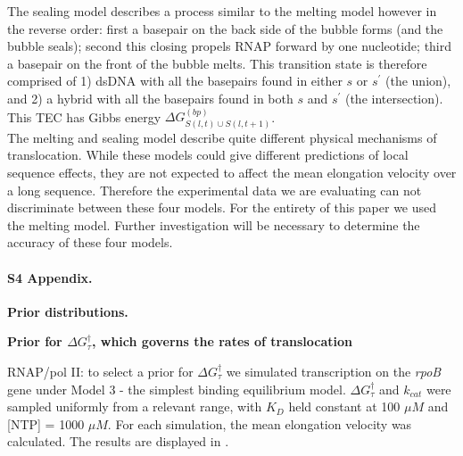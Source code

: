 \documentclass[10pt,letterpaper]{article}
\begin{document}
The sealing model describes a process similar to the melting model however in the reverse order: first a basepair on the back side of the bubble forms (and the bubble seals); second this closing propels RNAP forward by one nucleotide; third a basepair on the front of the bubble melts. This transition state is therefore comprised of 1) dsDNA with all the basepairs found in either $s$ or $s^\prime$ (the union), and 2) a hybrid with all the basepairs found in both $s$ and $s^\prime$ (the intersection). This TEC has Gibbs energy $\Delta G_{S(l,t)\cup S(l,t+1)}^{(bp)}$.  \\


The melting and sealing model describe quite different physical mechanisms of translocation. While these models could give different predictions of local sequence effects, they are not expected to affect the mean elongation velocity over a long sequence. Therefore the experimental data we are evaluating can not discriminate between these four models. For the entirety of this paper we used the melting model. Further investigation will be necessary to determine the accuracy of these four models. \\



\paragraph*{S4 Appendix.}
\label{S4_Appendix}
{\bf Prior distributions.} 

\textbf{Prior for $\Delta G^\dag_{\tau}$, which governs the rates of translocation} \par



RNAP/pol II: to select a prior for $\Delta G^\dag_{\tau}$ we simulated transcription on the {\it rpoB} gene under Model 3 - the simplest binding equilibrium model. $\Delta G^\dag_{\tau}$ and $k_{cat}$ were sampled uniformly from a relevant range, with $K_D$ held constant at 100 $\mu M$ and [NTP] = 1000 $\mu M$. For each simulation, the mean elongation velocity was calculated. The results are displayed in . 
\end{document}
